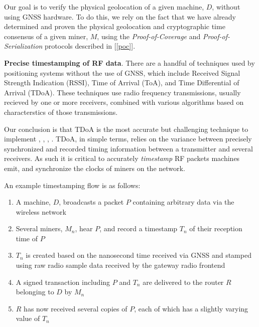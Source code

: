 \documentclass[10pt, nonatbib, nocopyrightspace, reprint]{sigplanconf}
\newcommand{\secref}[1]{[\autoref{#1}]}
\begin{document}
Our goal is to verify the physical geolocation of a given machine, $D$, without using GNSS hardware. To do this, we rely on the fact that we have already determined and proven the physical geolocation and cryptographic time consensus of a given miner, $M$, using the \emph{Proof-of-Coverage} and \emph{Proof-of-Serialization} protocols described in \secref{poc}.

\textbf{Precise timestamping of RF data}. There are a handful of techniques used by positioning systems without the use of GNSS, which include Received Signal Strength Indication (RSSI), Time of Arrival (ToA), and Time Differential of Arrival (TDoA). These techniques use radio frequency transmissions, usually recieved by one or more receivers, combined with various algorithms based on characterstics of those transmissions.

Our conclusion is that TDoA is the most accurate but challenging technique to implement \cite{tdoavsrssi}, \cite{tdoavstoa}, \cite{wifipositioning}, \cite{locationestimation}. TDoA, in simple terms, relies on the variance between precisely synchronized and recorded timing information between a transmitter and several receivers. As such it is critical to accurately \emph{timestamp} RF packets machines emit, and synchronize the clocks of miners on the network.

An example timestamping flow is as follows:

\begin{enumerate}
  \item A machine, $D$, broadcasts a packet $P$ containing arbitrary data via the wireless network
  \item Several miners, $M_n$, hear $P$, and record a timestamp $T_n$ of their reception time of $P$
  \item $T_n$ is created based on the nanosecond time received via GNSS and stamped using raw radio sample data received by the gateway radio frontend
  \item A signed transaction including $P$ and $T_n$ are delivered to the router $R$ belonging to $D$ by $M_n$
  \item $R$ has now received several copies of $P$, each of which has a slightly varying value of $T_n$
\end{enumerate}
\end{document}
